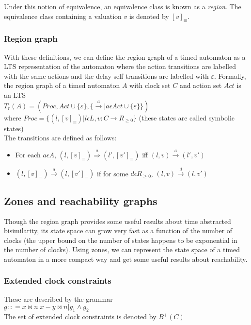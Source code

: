 \documentclass{article}
\begin{document}
Under this notion of equivalence, an equivalence class is known
as a \emph{region}. The equivalence class containing a valuation $v$
is denoted by $[v]_{\equiv}$.

\subsubsection{Region graph}
With these definitions, we can define the
region graph of a timed automaton as a LTS representation of the
automaton where the action transitions are labelled with the same
actions and the delay self-transitions are labelled with
$\varepsilon$.
Formally, the region graph of a timed automaton $A$ with clock set $C$
and action set $Act$ is an LTS\\
$T_r(A) = (Proc,Act \cup \{\varepsilon\}, \{\xrightarrow{a}|a \epsilon
Act \cup \{\varepsilon\}\})$\\
where $Proc = \{(l, [v]_{\equiv}) | l \epsilon L, v: C \rightarrow
R_{\ge 0}\}$ (these states are called symbolic states)\\
The transitions are defined as follows:
\begin{itemize}
\item For each $a \epsilon A$, $(l, [v]_{\equiv})
  \overset{a}{\Rightarrow} (l', [v']_{\equiv})$ iff $(l,v)
  \overset{a}{\rightarrow} (l', v')$
\item $(l, [v]_{\equiv}) \xrightarrow{a} (l, [v']_{\equiv})$ if
  for some $d \epsilon R_{\ge 0}$, $(l, v) \xrightarrow{d} (l,
  v')$
\end{itemize}

\subsection{Zones and reachability graphs}

Though the region graph provides some useful results about time
abstracted bisimilarity, its state space can grow very fast as a
function of the number of clocks (the upper bound on the number of
states happens to be exponential in the number of clocks). Using
zones, we can represent the state space of a timed automaton in a more
compact way and get some useful results about reachability.

\subsubsection{Extended clock constraints}
These are described by the  grammar\\
$g :: = x \bowtie n | x - y \bowtie n | g_1 \wedge g_2$\\
The set of extended clock constraints is denoted by $B^+(C)$
\end{document}
